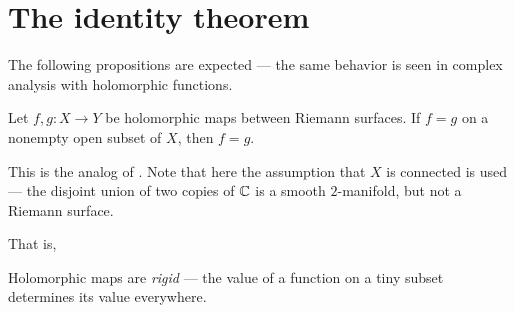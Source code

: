 \section{The identity theorem}

The following propositions are expected --- the same behavior is seen in complex analysis with
holomorphic functions.

\begin{theorem}
	Let $f, g \colon X \to Y$ be holomorphic maps between Riemann surfaces. If $f = g$ on a nonempty
	open subset of $X$, then $f = g$.
\end{theorem}
This is the analog of . Note that here the assumption that $X$ is connected
is used --- the disjoint union of two copies of $\mathbb C$ is a smooth $2$-manifold, but not a Riemann
surface.

That is,
\begin{moral}
	Holomorphic maps are \emph{rigid} --- the value of a function on a tiny subset determines its
	value everywhere.
\end{moral}
